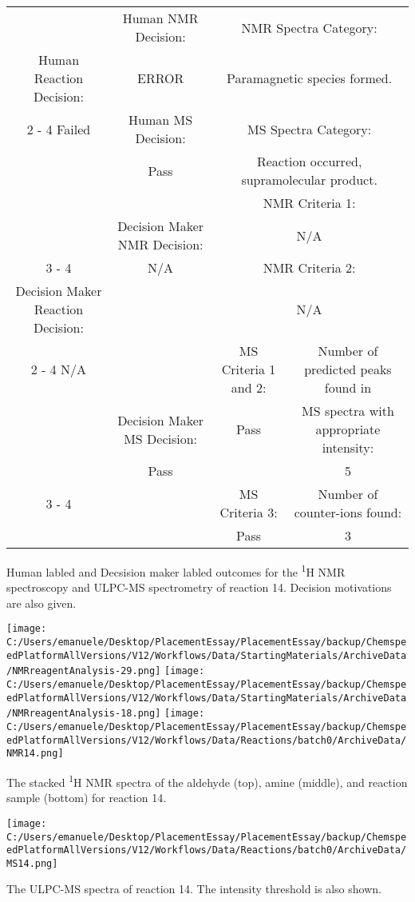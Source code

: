 \documentclass{article}%
\begin{document}
\begin{Decision Table}[H]%
\begin{tabular}{|c|c|c|c|}%
\hline%
&Human NMR Decision:&\multicolumn{2}{|c|}{NMR Spectra Category:}\\%
Human Reaction Decision:&ERROR&\multicolumn{2}{|c|}{Paramagnetic species formed.}\\%
\cline{2%
-%
4}%
Failed&Human MS Decision:&\multicolumn{2}{|c|}{MS Spectra Category:}\\%
&Pass&\multicolumn{2}{|c|}{Reaction occurred, supramolecular product.}\\%
\hline%
&&\multicolumn{2}{|c|}{NMR Criteria 1:}\\%
&Decision Maker NMR Decision:&\multicolumn{2}{|c|}{N/A}\\%
\cline{3%
-%
4}%
&N/A&\multicolumn{2}{|c|}{NMR Criteria 2:}\\%
Decision Maker Reaction Decision:&&\multicolumn{2}{|c|}{N/A}\\%
\cline{2%
-%
4}%
N/A&&MS Criteria 1 and 2:&Number of predicted peaks found in\\%
&Decision Maker MS Decision:&Pass&MS spectra with appropriate intensity:\\%
&Pass&&5\\%
\cline{3%
-%
4}%
&&MS Criteria 3:&Number of counter{-}ions found:\\%
&&Pass&3\\%
\hline%
\end{tabular}%
\caption{Human labled and Decsision maker labled outcomes for the \textsuperscript{1}H NMR spectroscopy and ULPC-MS spectrometry of reaction 14. Decision motivations are also given.}%
\end{Decision Table}%
\begin{NMR Spectra}[H]%
\begin{center}%
\texttt{[image: C:/Users/emanuele/Desktop/PlacementEssay/PlacementEssay/backup/ChemspeedPlatformAllVersions/V12/Workflows/Data/StartingMaterials/ArchiveData/NMRreagentAnalysis-29.png]}\hfill%
\texttt{[image: C:/Users/emanuele/Desktop/PlacementEssay/PlacementEssay/backup/ChemspeedPlatformAllVersions/V12/Workflows/Data/StartingMaterials/ArchiveData/NMRreagentAnalysis-18.png]}\hfill%
\texttt{[image: C:/Users/emanuele/Desktop/PlacementEssay/PlacementEssay/backup/ChemspeedPlatformAllVersions/V12/Workflows/Data/Reactions/batch0/ArchiveData/NMR14.png]}\hfill%
\end{center}%
\caption{The stacked \textsuperscript{1}H NMR spectra of the aldehyde (top), amine (middle), and reaction sample (bottom) for reaction 14.}%
\end{NMR Spectra}%
\begin{MS Spectra}[H]%
\begin{center}%
\texttt{[image: C:/Users/emanuele/Desktop/PlacementEssay/PlacementEssay/backup/ChemspeedPlatformAllVersions/V12/Workflows/Data/Reactions/batch0/ArchiveData/MS14.png]}\hfill%
\end{center}%
\caption{The ULPC-MS spectra of reaction 14. The intensity threshold is also shown.}%
\end{MS Spectra}%
\end{document}
